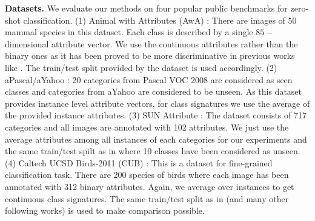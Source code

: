 \documentclass[10pt,twocolumn,letterpaper]{article}
\begin{document}
\textbf{Datasets.}
We evaluate our methods on four popular public benchmarks for zero-shot classification.
(1) Animal with Attributes (AwA) \cite{lampert09}: There are images of 50 mammal species in this dataset.
Each class is described by a single $85-$dimensional attribute vector. We use the continuous attributes rather than
the binary ones as it has been proved to be more discriminative in previous works like \cite{Akata2015}. The train/test split provided by the dataset is used accordingly.
(2) aPascal/aYahoo \cite{farhadi09}: 20 categories from Pascal VOC 2008 \cite{pascal} are considered as seen classes and
categories from aYahoo are considered to be unseen. As this dataset provides instance level attribute vectors,
for class signatures we use the average of the provided instance attributes.
(3) SUN Attribute \cite{sun}: The dataset consists of 717 categories and all images are annotated with 102 attributes. We just
use the average attributes among all instances of each categories for our experiments and the same train/test spilt
as in \cite{jayaraman14} where 10 classes have been considered as unseen.
(4) Caltech UCSD Birds-2011 (CUB) \cite{cub}: This is a dataset for fine-grained classification task. There are 200 species of
birds where each image has been annotated with 312 binary attributes. Again, we average over instances to get continuous class signatures.
The same train/test split as in \cite{akata13} (and many other following works) is used to make comparison possible.
\end{document}
